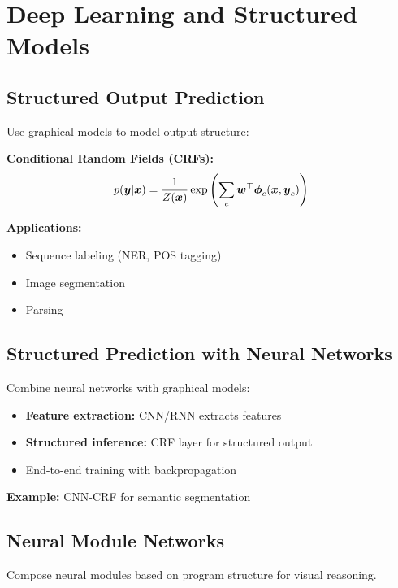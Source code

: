 
\section{Deep Learning and Structured Models}
\label{sec:deep-structured}

\subsection{Structured Output Prediction}

Use graphical models to model output structure:

\textbf{Conditional Random Fields (CRFs):}
\begin{equation}
p(\boldsymbol{y}|\boldsymbol{x}) = \frac{1}{Z(\boldsymbol{x})} \exp\left(\sum_c \boldsymbol{w}^\top \boldsymbol{\phi}_c(\boldsymbol{x}, \boldsymbol{y}_c)\right)
\end{equation}

\textbf{Applications:}
\begin{itemize}
    \item Sequence labeling (NER, POS tagging)
    \item Image segmentation
    \item Parsing
\end{itemize}

\subsection{Structured Prediction with Neural Networks}

Combine neural networks with graphical models:
\begin{itemize}
    \item \textbf{Feature extraction:} CNN/RNN extracts features
    \item \textbf{Structured inference:} CRF layer for structured output
    \item End-to-end training with backpropagation
\end{itemize}

\textbf{Example:} CNN-CRF for semantic segmentation

\subsection{Neural Module Networks}

Compose neural modules based on program structure for visual reasoning.


